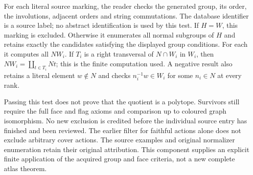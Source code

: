 \documentclass[11pt]{article}
\begin{document}
For each literal source marking, the reader checks the generated group,
its order, the involutions, adjacent orders and
string commutations. The database identifier is a source label; no abstract
identification is used by this test. If $H=W$, this marking is excluded. Otherwise it
enumerates all normal subgroups of $H$ and retains exactly the candidates
satisfying the displayed group conditions. For each it computes all
$NW_i$. If $T_i$ is a right transversal of $N\cap W_i$ in $W_i$, then
$NW_i=\coprod_{t\in T_i}Nt$; this is the finite computation used.
A negative result also retains a literal element $w\notin N$ and checks
$n_i^{-1}w\in W_i$ for some $n_i\in N$ at every rank.

Passing this test does not prove that the quotient is a polytope.
Survivors still require the full face and flag axioms and comparison
up to coloured graph isomorphism. No new exclusion is credited before
the individual source entry has finished and been reviewed. The earlier filter
for faithful actions alone does not exclude arbitrary cover actions.
The source examples
and original normalizer enumeration retain their original attribution.
This component supplies an explicit finite application of the acquired
group and face criteria, not a new complete atlas theorem.
\end{document}
